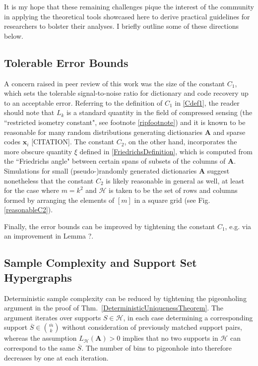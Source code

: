 It is my hope that these remaining challenges pique the interest of the community in applying the theoretical tools showcased here to derive practical guidelines for researchers to bolster their analyses. I briefly outline some of these directions below. 


\subsection{Tolerable Error Bounds}

A concern raised in peer review of this work was the size of the constant $C_1$, which sets the tolerable signal-to-noise ratio for dictionary and code recovery up to an acceptable error. Referring to the definition of $C_1$ in \eqref{Cdef1}, the reader should note that $L_k$ is a standard quantity in the field of compressed sensing (the ``restricted isometry constant", see footnote \ref{ripfootnote}) and it is known to be reasonable for many random distributions generating dictionaries $\mathbf{A}$ and sparse codes $\mathbf{x}_i$ [CITATION]. The constant $C_2$, on the other hand, incorporates the more obscure quantity $\xi$ defined in \eqref{FriedrichsDefinition}, which is computed from the ``Friedrichs angle" between certain spans of subsets of the columns of $\mathbf{A}$. Simulations for small (pseudo-)randomly generated dictionaries $\mathbf{A}$ suggest nonetheless that the constant $C_2$ is likely reasonable in general as well, at least for the case where $m=k^2$ and $\mathcal{H}$ is taken to be the set of rows and columns formed by arranging the elements of $[m]$ in a square grid (see Fig. \ref{reasonableC2}).

Finally, the error bounds can be improved by tightening the constant $C_1$, e.g. via an improvement in Lemma ?.

\subsection{Sample Complexity and Support Set Hypergraphs}

Deterministic sample complexity can be reduced by tightening the pigeonholing argument in the proof of Thm.~\ref{DeterministicUniquenessTheorem}. The argument iterates over supports $S \in \mathcal{H}$, in each case determining a corresponding support $\overline S \in {\bar m \choose k}$ without consideration of previously matched support pairs, whereas the assumption $L_\mathcal{H}(\mathbf{A}) > 0$ implies that no two supports in $\mathcal{H}$ can correspond to the same $\overline S$. The number of bins to pigeonhole into therefore decreases by one at each iteration. 


